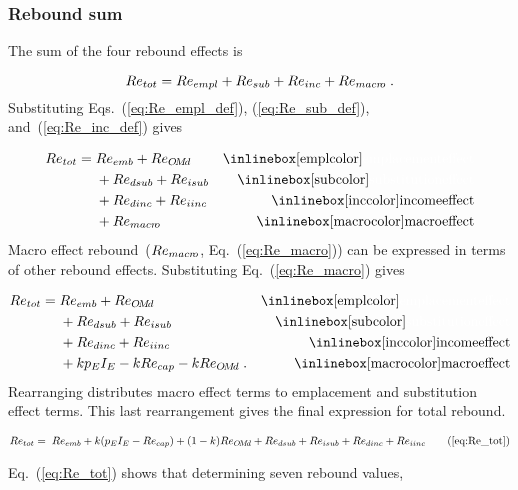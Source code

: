 \subsubsection{Rebound sum} 
\label{sec:total_rebound}

The sum of the four rebound effects is 

\begin{equation}
  Re_{tot} = Re_{empl} + Re_{sub} + Re_{inc} + Re_{macr\!o} \; .
\end{equation}
%
Substituting Eqs.~(\ref{eq:Re_empl_def}), (\ref{eq:Re_sub_def}), and~(\ref{eq:Re_inc_def}) gives

\begin{align}
  Re_{tot} = \; &Re_{emb} + Re_{\omd}      & \mathrm{\empleffect} \nonumber \\
                &+ Re_{dsub} + Re_{isub}   & \mathrm{\subeffect}  \nonumber \\
                &+ Re_{dinc} + Re_{iinc}   & \mathrm{\inceffect}  \nonumber \\
                &+ Re_{\macro}      & \mathrm{\macroeffect}
\end{align}
%
Macro effect rebound~($Re_{macr\!o}$, Eq.~(\ref{eq:Re_macro}))
can be expressed in terms of other rebound effects.
Substituting Eq.~(\ref{eq:Re_macro}) gives

\begin{align}
  Re_{tot} = \; &Re_{emb} + Re_{\omd}      & \mathrm{\empleffect}       \nonumber \\
                &+ Re_{dsub} + Re_{isub}   & \mathrm{\subeffect}        \nonumber \\
                &+ Re_{dinc} + Re_{iinc}   & \mathrm{\inceffect}        \nonumber \\
                &+ k p_E I_E - k Re_{cap} - k Re_{\omd} \; .  & \mathrm{\macroeffect}
\end{align}
%
Rearranging distributes macro effect terms 
to emplacement and substitution effect terms.
This last rearrangement gives the final expression for total rebound.

\begin{align}
  Re_{tot} = \; \Retoteqn{} \tag{\ref{eq:Re_tot}}
\end{align}

Eq.~(\ref{eq:Re_tot}) shows that determining seven rebound values,

